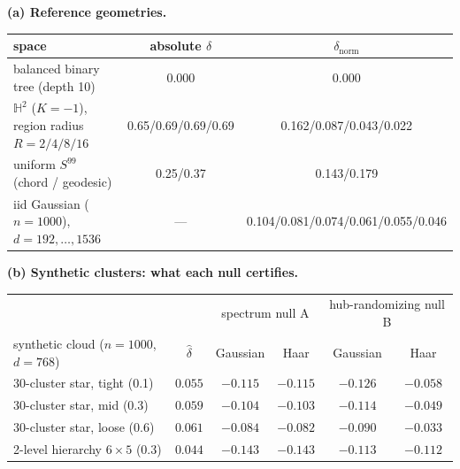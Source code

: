\begin{table}[H]
\centering
\small
\setlength{\tabcolsep}{4pt}
\noindent\textbf{(a) Reference geometries.}\par\vspace{1.5pt}
\begin{tabular}{lcc}
\toprule
space & absolute $\delta$ & $\delta_{\text{norm}}$ \\
\midrule
balanced binary tree (depth 10) & 0.000 & 0.000 \\
$\mathbb{H}^2$ ($K{=}-1$), region radius $R{=}2/4/8/16$ & 0.65/0.69/0.69/0.69 & 0.162/0.087/0.043/0.022 \\
uniform $S^{99}$ (chord / geodesic) & 0.25/0.37 & 0.143/0.179 \\
iid Gaussian ($n{=}1000$), $d{=}192,\dots,1536$ & --- & 0.104/0.081/0.074/0.061/0.055/0.046 \\
\bottomrule
\end{tabular}
\par\vspace{5pt}
\noindent\textbf{(b) Synthetic clusters: what each null certifies.}\par\vspace{1.5pt}
\begin{tabular}{lc|cc|cc}
\toprule
& & \multicolumn{2}{c|}{spectrum null A} & \multicolumn{2}{c}{hub-randomizing null B} \\
synthetic cloud ($n{=}1000$, $d{=}768$) & $\hat\delta$ & Gaussian & Haar & Gaussian & Haar \\
\midrule
30-cluster star, tight (0.1) & $0.055$ & $-0.115$ & $-0.115$ & $-0.126$ & $-0.058$ \\
30-cluster star, mid (0.3) & $0.059$ & $-0.104$ & $-0.103$ & $-0.114$ & $-0.049$ \\
30-cluster star, loose (0.6) & $0.061$ & $-0.084$ & $-0.082$ & $-0.090$ & $-0.033$ \\
2-level hierarchy $6\times5$ (0.3) & $0.044$ & $-0.143$ & $-0.143$ & $-0.113$ & $-0.112$ \\
\bottomrule
\end{tabular}
\par\vspace{5pt}

\end{table}
